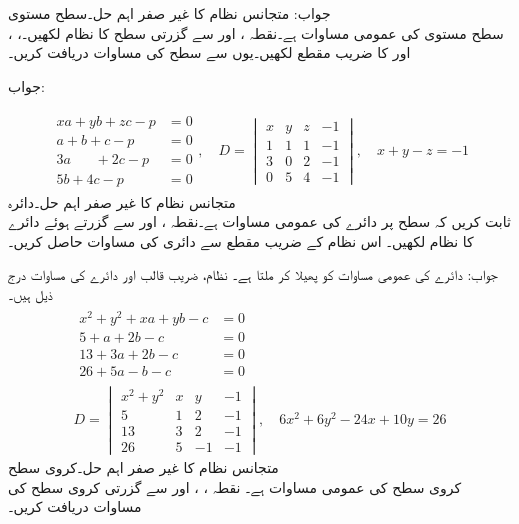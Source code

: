 جواب:  
\quad متجانس نظام کا غیر صفر اہم حل۔سطح مستوی\\
سطح مستوی کی عمومی مساوات  ہے۔نقطہ ،  اور  سے گزرتی سطح کا نظام لکھیں۔، ،  اور  کا  ضریب  مقطع  لکھیں۔یوں  سے سطح کی مساوات دریافت کریں۔

جواب:

\begin{gather*}
\begin{aligned}
xa+yb+zc-p&=0\\
a+b+c-p&=0\\
3a\phantom{+yb}+2c-p&=0\\
5b+4c-p&=0
\end{aligned},\quad 
D=\begin{vmatrix}
x&y&z&-1\\ 1&1&1&-1\\3&0&2&-1\\0&5&4&-1
\end{vmatrix},\quad x+y-z=-1
\end{gather*}
\quad متجانس نظام کا غیر صفر اہم حل۔دائرہ\\
ثابت کریں کہ  سطح پر دائرے کی عمومی مساوات  ہے۔نقطہ ،  اور  سے گزرتے ہوئے دائرے کا نظام لکھیں۔ اس نظام کے  ضریب  مقطع سے دائری کی مساوات حاصل کریں۔ 




جواب: دائرے کی عمومی مساوات   کو پھیلا کر  ملتا ہے۔ نظام،  ضریب  قالب اور دائرے کی مساوات درج ذیل ہیں۔
\begin{gather*}
\begin{aligned}
x^2+y^2+xa+yb-c&=0\\
5+a+2b-c&=0\\
13+3a+2b-c&=0\\
26+5a-b-c&=0
\end{aligned}\\ 
D=
\begin{vmatrix}
x^2+y^2&x&y&-1\\5&1&2&-1\\13&3&2&-1\\26&5&-1&-1
\end{vmatrix},\quad 
6x^2+6y^2-24x+10y=26
\end{gather*}
\quad متجانس نظام کا غیر صفر اہم حل۔کروی سطح\\
کروی سطح کی عمومی مساوات  ہے۔ نقطہ ، ،   اور  سے گزرتی کروی سطح کی مساوات دریافت کریں۔


